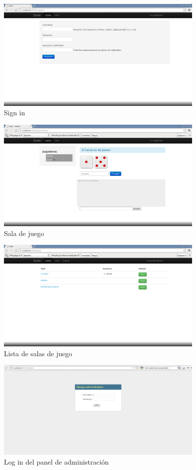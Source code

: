 \documentclass[a4paper,11pt]{article}
\begin{document}
\begin{figure}[h!]
	\centering
	\includegraphics[width=0.9\textwidth]{Sign_in.png}
	\caption{Sign in}
\end{figure}
\newpage
\begin{figure}[h!]
	\centering
	\includegraphics[width=0.9\textwidth]{Sala.png}
	\caption{Sala de juego}
\end{figure}

\begin{figure}[h!]
	\centering
	\includegraphics[width=0.9\textwidth]{salas.png}
	\caption{Lista de salas de juego}
\end{figure}
\newpage
\begin{figure}[h!]
	\centering
	\includegraphics[width=0.9\textwidth]{Admin_log.png}
	\caption{Log in del panel de administración}
\end{figure}
\end{document}
